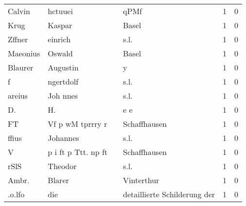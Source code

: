 \begin{center}
\begin{tiny}
\begin{longtabu}{llllrr}
                   Calvin &                            hctuuei &             &                                        qPMf &          1 &         0 \\
                     Krug &                             Kaspar &             &                                       Basel &          1 &         0 \\
                   Zffner &                            einrich &             &                                        s.l. &          1 &         0 \\
                 Maeonius &                             Oswald &             &                                       Basel &          1 &         0 \\
                  Blaurer &                           Augustin &             &                                           y &          1 &         0 \\
                        f &                          ngertdolf &             &                                        s.l. &          1 &         0 \\
                   areius &                           Joh nnes &             &                                        s.l. &          1 &         0 \\
                       D. &                                 H. &             &                                         e e &          1 &         0 \\
                       FT &                   Vf p wM tprrry r &             &                                Schaffhausen &          1 &         0 \\
                    ffius &                           Johannes &             &                                        s.l. &          1 &         0 \\
                        V &                p i ft p Ttt. np ft &             &                                Schaffhausen &          1 &         0 \\
                     rSlS &                            Theodor &             &                                        s.l. &          1 &         0 \\
                    Ambr. &                             Blarer &             &                                  Vinterthur &          1 &         0 \\
                   .o.lfo &                                die &             &                detaillierte Schilderung der &          1 &         0 \\

\end{longtabu}
\end{tiny}
\end{center}
